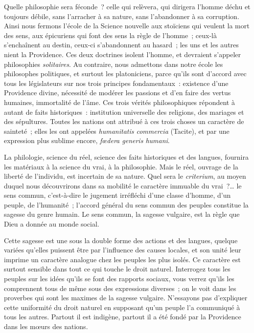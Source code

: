 \documentclass[french,twoside]{book} %
\begin{document}
Quelle philosophie sera féconde ? celle qui relèvera,  qui dirigera l’homme déchu et toujours débile, sans l’arracher à sa nature, sans l’abandonner à sa corruption. Ainsi nous fermons l’école de la Science nouvelle aux stoïciens qui veulent la mort des sens, aux épicuriens qui font des sens la règle de l’homme ; ceux-là s’enchaînent au destin, ceux-ci s’abandonnent au hasard ; les uns et les autres nient la Providence. Ces deux doctrines isolent l’homme, et devraient s’appeler philosophies {\itshape solitaires}. Au contraire, nous admettons dans notre école les philosophes politiques, et surtout les platoniciens, parce qu’ils sont d’accord avec tous les législateurs sur nos trois principes fondamentaux : existence d’une Providence divine, nécessité de modérer les passions et d’en faire des vertus humaines, immortalité de l’âme. Ces trois vérités philosophiques répondent à autant de faits historiques : institution universelle des religions, des mariages et des sépultures. Toutes les nations ont attribué à ces trois choses un caractère de sainteté ; elles les ont appelées \emph{{\itshape humanitatis commercia}} (Tacite), et par une expression plus sublime encore, \emph{{\itshape fœdera generis humani}}.\par
La philologie, science du réel, science des faits historiques et des langues, fournira les matériaux à la science du vrai, à la philosophie. Mais le réel, ouvrage de la liberté de l’individu, est incertain de sa nature. Quel sera le {\itshape criterium}, au moyen duquel  nous découvrirons dans sa mobilité le caractère immuable du vrai ?… le sens commun, c’est-à-dire le jugement irréfléchi d’une classe d’homme, d’un peuple, de l’humanité ; l’accord général du sens commun des peuples constitue la sagesse du genre humain. Le sens commun, la sagesse vulgaire, est la règle que Dieu a donnée au monde social.\par
Cette sagesse est une sous la double forme des actions et des langues, quelque variées qu’elles puissent être par l’influence des causes locales, et son unité leur imprime un caractère analogue chez les peuples les plus isolés. Ce caractère est surtout sensible dans tout ce qui touche le droit naturel. Interrogez tous les peuples sur les idées qu’ils se font des rapports sociaux, vous verrez qu’ils les comprennent tous de même sous des expressions diverses ; on le voit dans les proverbes qui sont les maximes de la sagesse vulgaire. N’essayons pas d’expliquer cette uniformité du droit naturel en supposant qu’un peuple l’a communiqué à tous les autres. Partout il est indigène, partout il a été fondé par la Providence dans les mœurs des nations.\par
\end{document}

